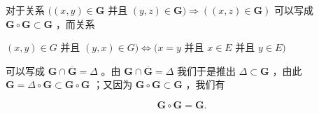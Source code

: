 对于关系 \(((x, y) \in \mathbf{G}\) 并且 \((y, z) \in \mathbf{G}) \Longrightarrow ((x, z) \in \mathbf{G})\) 可以写成 \(\mathbf{G} \circ \mathbf{G} \subset \mathbf{G}\) ，而关系

\((x, y) \in G\) 并且 \((y, x) \in G) \iff (x = y\) 并且 \(x \in E\) 并且 \(y \in E)\)

可以写成 \(\mathbf{G} \cap \overline{\mathbf{G}} = \Delta\) 。由 \(\mathbf{G} \cap \overline{\mathbf{G}} = \Delta\) 我们于是推出 \(\Delta \subset \mathbf{G}\) ，由此 \(\mathbf{G} = \Delta \circ \mathbf{G} \subset \mathbf{G} \circ \mathbf{G}\) ；又因为 \(\mathbf{G} \circ \mathbf{G} \subset \mathbf{G}\) ，我们有

\[
\mathbf {G} \circ \mathbf {G} = \mathbf {G}.
\]

